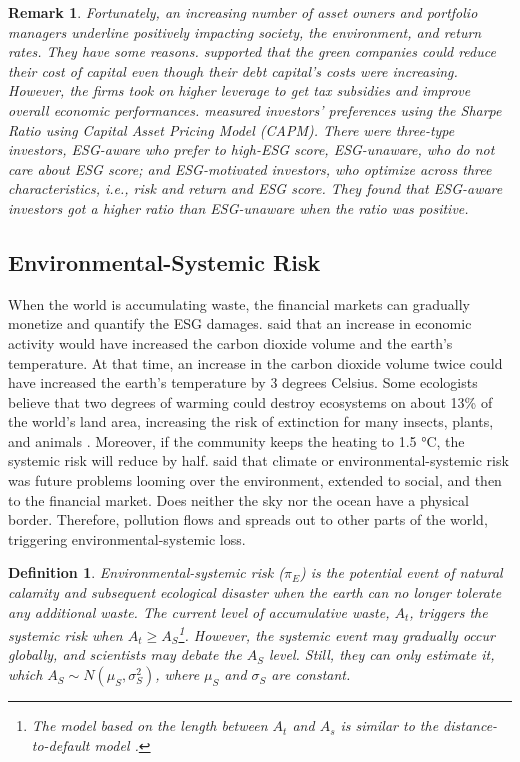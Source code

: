 \documentclass[sn-basic]{sn-jnl}%
\theoremstyle{thmstyleone}%
\theoremstyle{thmstyletwo}%
\newtheorem{remark}{Remark}%
\theoremstyle{thmstylethree}%
\newtheorem{definition}{Definition}%
\begin{document}
\begin{remark}
	Fortunately, an increasing number of asset owners and portfolio managers underline positively impacting society, the environment, and return rates. They have some reasons. \citet{sharfman2008environmental} supported that the green companies could reduce their cost of capital even though their debt capital’s costs were increasing. However, the firms took on higher leverage to get tax subsidies and improve overall economic performances. \citet{pedersen2020responsible} measured investors' preferences using the Sharpe Ratio using Capital Asset Pricing Model (CAPM). There were three-type investors, ESG-aware who prefer to high-ESG score, ESG-unaware, who do not care about ESG score; and ESG-motivated investors, who optimize across three characteristics, i.e., risk and return and ESG score. They found that ESG-aware investors got a higher ratio than ESG-unaware when the ratio was positive.
\end{remark}

\subsection{Environmental-Systemic Risk}
When the world is accumulating waste, the financial markets can gradually monetize and quantify the ESG damages. \citet{nordhaus1977economic} said that an increase in economic activity would have increased the carbon dioxide volume and the earth's temperature. At that time, an increase in the carbon dioxide volume twice could have increased the earth's temperature by 3 degrees Celsius. Some ecologists believe that two degrees of warming could destroy ecosystems on about 13\% of the world's land area, increasing the risk of extinction for many insects, plants, and animals \citep{tollefson2018ipcc}. Moreover, if the community keeps the heating to 1.5 °C, the systemic risk will reduce by half. \citet{leboullenger2017assess} said that climate or environmental-systemic risk was future problems looming over the environment, extended to social, and then to the financial market. Does neither the sky nor the ocean have a physical border. Therefore, pollution flows and spreads out to other parts of the world, triggering environmental-systemic loss.

\begin{definition}
	\emph{Environmental-systemic risk} ($\pi_E$) is the potential event of natural calamity and subsequent ecological disaster when the earth can no longer tolerate any additional waste. The current level of accumulative waste, $A_t$, triggers the systemic risk when $A_t\geq A_S$\footnote{The model based on the length between $A_t$ and $A_s$ is similar to the distance-to-default model \citep{merton1974pricing}.}. However, the systemic event may gradually occur globally, and scientists may debate the $A_S$ level. Still, they can only estimate it, which $A_S\sim N\left(\mu_S,\sigma_S^2\right)$, where $\mu_S$ and $\sigma_S$ are constant.
\end{definition}
\end{document}

